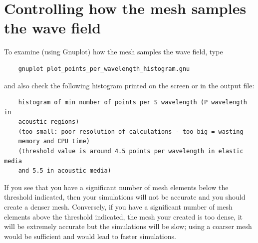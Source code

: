 \section{Controlling how the mesh samples the wave field}

To examine (using Gnuplot) how the mesh samples the wave field, type
%
\begin{verbatim}
    gnuplot plot_points_per_wavelength_histogram.gnu
\end{verbatim}
%
and also check the following histogram printed on the screen or in the output file:
%
\begin{verbatim}
    histogram of min number of points per S wavelength (P wavelength in
    acoustic regions)
    (too small: poor resolution of calculations - too big = wasting
    memory and CPU time)
    (threshold value is around 4.5 points per wavelength in elastic media
    and 5.5 in acoustic media)
\end{verbatim}

If you see that you have a significant number of mesh elements below the threshold indicated, then your simulations
will not be accurate and you should create a denser mesh. Conversely, if you have a significant number of mesh elements above the threshold indicated,
the mesh your created is too dense, it will be extremely accurate but the simulations will be slow; using a coarser mesh would be sufficient and would lead to faster simulations.



